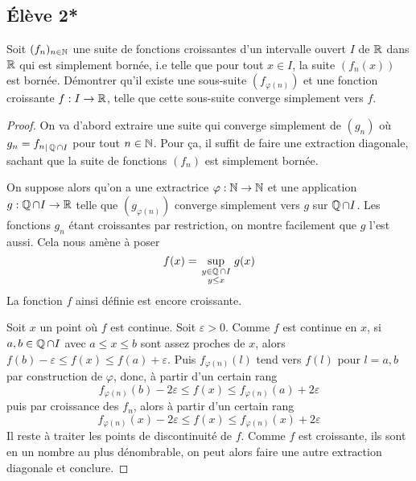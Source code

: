 \documentclass[10pt]{scrartcl}
\begin{document}
    \subsection*{Élève 2*}
    \begin{exo}
        Soit $(f_n)_{n\in\operatorname{\mathbb N}}$ une suite de fonctions croissantes d'un intervalle ouvert $I$ de $\operatorname{\mathbb R}$ dans $\operatorname{\mathbb R}$ qui est simplement bornée, i.e telle que pour tout $x\in I$, la suite $(f_n(x))$ est bornée.
        Démontrer qu'il existe une sous-suite $(f_{\varphi(n)})$ et une fonction croissante $f:I\to\operatorname{\mathbb R}$, telle que cette sous-suite converge simplement vers $f$.
    \end{exo}

    \begin{proof}
        On va d'abord extraire une suite qui converge simplement de $(g_n)$ où $g_n={f_n}_{|\operatorname{\mathbb Q}\cap I}$ pour tout $n\in\operatorname{\mathbb N}$.
        Pour ça, il suffit de faire une extraction diagonale, sachant que la suite de fonctions $(f_n)$ est simplement bornée.

        On suppose alors qu'on a une extractrice $\varphi:\operatorname{\mathbb N}\to\operatorname{\mathbb N}$ et une application $g:\operatorname{\mathbb Q}\cap I\to\operatorname{\mathbb R}$ telle que $(g_{\varphi(n)})$ converge simplement vers $g$ sur $\operatorname{\mathbb Q}\cap I$.
        Les fonctions $g_n$ étant croissantes par restriction, on montre facilement que $g$ l'est aussi. Cela nous amène à poser 
        \[
            f(x)=\sup_{\begin{smallmatrix}y\in \operatorname{\mathbb Q}\cap I\\ y\leq x\end{smallmatrix}}g(x)
        \]
        La fonction $f$ ainsi définie est encore croissante.

        Soit $x$ un point où $f$ est continue.
        Soit $\varepsilon > 0$. Comme $f$ est continue en $x$, si $a,b\in\operatorname{\mathbb Q}\cap I$ avec $a\leq x\leq b$ sont assez proches de $x$, alors $f(b)-\varepsilon\leq f(x)\leq f(a)+\varepsilon$. 
        Puis $f_{\varphi(n)}(l)$ tend vers $f(l)$ pour $l=a,b$ par construction de $\varphi$, donc, à partir d'un certain rang 
        \[
            f_{\varphi(n)}(b)-2\varepsilon\leq f(x)\leq f_{\varphi(n)}(a)+2\varepsilon
        \]
        puis par croissance des $f_n$, alors à partir d'un certain rang 
        \[
            f_{\varphi(n)}(x)-2\varepsilon\leq f(x)\leq f_{\varphi(n)}(x)+2\varepsilon
        \]
        Il reste à traiter les points de discontinuité de $f$. 
        Comme $f$ est croissante, ils sont en un nombre au plus dénombrable, on peut alors faire une autre extraction diagonale et conclure.
    \end{proof}
\end{document}
